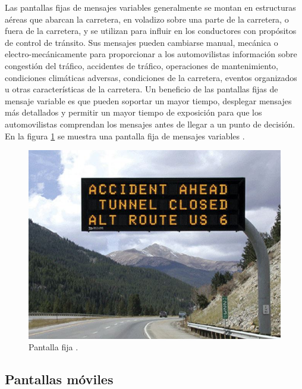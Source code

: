 Las pantallas fijas de mensajes variables generalmente se montan en estructuras aéreas que abarcan la carretera, en voladizo sobre una parte de la carretera, o fuera de la carretera, y se utilizan para influir en los conductores con propósitos de control de tránsito. Sus mensajes pueden cambiarse manual, mecánica o electro-mecánicamente para proporcionar a los automovilistas información sobre congestión del tráfico, accidentes de tráfico, operaciones de mantenimiento, condiciones climáticas adversas, condiciones de la carretera, eventos organizados u otras características de la carretera. Un beneficio de las pantallas fijas de mensaje variable es que pueden soportar un mayor tiempo, desplegar mensajes más detallados y permitir un mayor tiempo de exposición para que los automovilistas comprendan los mensajes antes de llegar a un punto de decisión. En la figura \ref{fig:vmsp} se muestra una pantalla fija de mensajes variables \citep{VMSTYPES}.


\begin{figure}[htpb]
	\centering
	\includegraphics[width=.9 \textwidth]{../Figures/vmspermanente.jpg} 
	\caption{Pantalla fija \protect\footnotemark.}
	\label{fig:vmsp}
\end{figure}






\subsection{Pantallas móviles}

